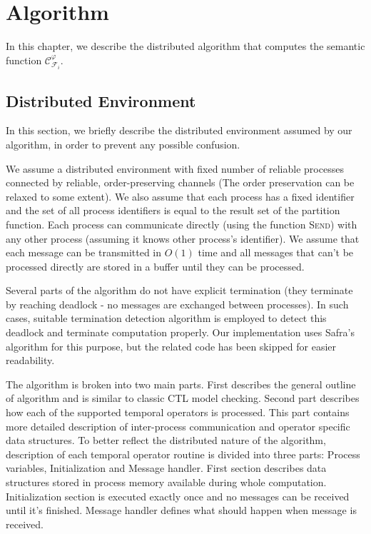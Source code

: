\documentclass[12pt,oneside]{fithesis2}
\newcommand{\sem}{\ensuremath{\mathcal{C}_{\kf{i}{}}^\varphi}}
\newcommand{\method}[1]{\textnormal{\textsc{#1}}}
\newcommand{\kf}[2]{\ensuremath{\mathcal{F}^{#2}_{#1}}}
\begin{document}
		
    \chapter{Algorithm}
    
    	In this chapter, we describe the distributed algorithm that computes the semantic function $\sem$. 
    	
    	\section{Distributed Environment}
    	
		In this section, we briefly describe the distributed environment assumed by our algorithm, in order to prevent any possible confusion.
		
		We assume a distributed environment with fixed number of reliable processes connected by reliable, order-preserving channels (The order preservation can be relaxed to some extent). We also assume that each process has a fixed identifier and the set of all process identifiers is equal to the result set of the partition function. Each process can communicate directly (using the function \method{Send}) with any other process (assuming it knows other process's identifier). We assume that each message can be transmitted in $O(1)$ time and all messages that can't be processed directly are stored in a buffer until they can be processed.		
		
		Several parts of the algorithm do not have explicit termination (they terminate by reaching deadlock - no messages are exchanged between processes). In such cases, suitable termination detection algorithm is employed to detect this deadlock and terminate computation properly. Our implementation uses Safra's algorithm \cite{safra} for this purpose, but the related code has been skipped for easier readability.
    	
		The algorithm is broken into two main parts. First describes the general outline of algorithm and is similar to classic CTL model checking. Second part describes how each of the supported temporal operators is processed. This part contains more detailed description of inter-process communication and operator specific data structures. To better reflect the distributed nature of the algorithm, description of each temporal operator routine is divided into three parts: Process variables, Initialization and Message handler. First section describes data structures stored in process memory available during whole computation. Initialization section is executed exactly once and no messages can be received until it's finished. Message handler defines what should happen when message is received.  
		
\end{document}
